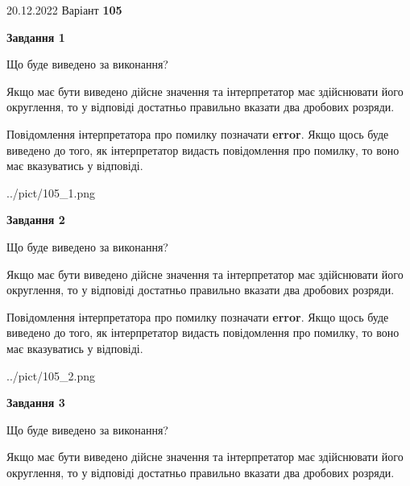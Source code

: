\documentclass[12pt, ukrainian]{article}
\begin{document}
{20.12.2022 Варіант \No \textbf { 105 }\par}
{
\begin {Large}

{\begin {center}\textbf{Завдання 1}\end {center}}\par
Що буде виведено за виконання? \par

Якщо має бути виведено дійсне значення та інтерпретатор має здійснювати його округлення, 
то у відповіді достатньо правильно вказати два дробових розряди.

Повідомлення інтерпретатора про помилку позначати \textbf{error}.
Якщо щось буде виведено до того, як інтерпретатор видасть повідомлення про помилку, 
то воно має вказуватись у відповіді. \par

\begin{center}
	{../pict/105_1.png}
\end{center}
\newpage

{\begin {center}\textbf{Завдання 2}\end {center}}\par
Що буде виведено за виконання? \par

Якщо має бути виведено дійсне значення та інтерпретатор має здійснювати його округлення, 
то у відповіді достатньо правильно вказати два дробових розряди.

Повідомлення інтерпретатора про помилку позначати \textbf{error}.
Якщо щось буде виведено до того, як інтерпретатор видасть повідомлення про помилку, 
то воно має вказуватись у відповіді. \par

\begin{center}
	{../pict/105_2.png}
\end{center}
\newpage

{\begin {center}\textbf{Завдання 3}\end {center}}\par
Що буде виведено за виконання? \par

Якщо має бути виведено дійсне значення та інтерпретатор має здійснювати його округлення, 
то у відповіді достатньо правильно вказати два дробових розряди.


\end{Large}}
\end{document}
